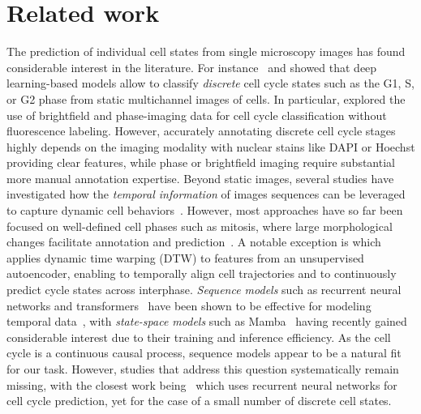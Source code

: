 \section{Related work}
The prediction of individual cell states from single microscopy images has found considerable interest in the literature. For instance~\cite{rappez_deepcycle_2020} and \cite{narotamo_machine_2021, li_predicting_2024} showed that deep learning-based models allow to classify \emph{discrete} cell cycle states such as the G1, S, or G2 phase from static multichannel images of cells. In particular, \cite{eulenberg_reconstructing_2017,blasi_label-free_2016,jin_imbalanced_2021,he_cell_2022} explored the use of brightfield and phase-imaging data for cell cycle classification without fluorescence labeling. However, accurately annotating discrete cell cycle stages highly depends on the imaging modality with nuclear stains like DAPI or Hoechst providing clear features, while phase or brightfield imaging require substantial more manual annotation expertise. 
Beyond static images, several studies have investigated how the \emph{temporal information} of images sequences can be leveraged to capture dynamic cell behaviors~\cite{wang_live-cell_2020, zhao_insights_2024,chu_prediction_2020}. 
However, most approaches have so far been focused on well-defined cell phases such as mitosis, where large morphological changes facilitate annotation and prediction~\cite{held_cellcognition_2010,moreno-andres_livecellminer_2022,jose_automatic_2024, su_spatiotemporal_2017}. A notable exception is \cite{ulicna_learning_2023} which applies dynamic time warping (DTW) to features from an unsupervised autoencoder, enabling to temporally align cell trajectories and to continuously predict cycle states across interphase. 
\emph{Sequence models} such as recurrent neural networks and transformers~\cite{vaswani_attention_nodate} have been shown to be effective for modeling temporal data~\cite{hewamalage2021recurrent,wen2022transformers}, with \emph{state-space models} such as Mamba~\cite{gu_efficiently_2022,gu_mamba_2024} having recently gained considerable interest due to their training and inference efficiency. 
As the cell cycle is a continuous causal process, sequence models appear to be a natural fit for our task. However, studies that address this question systematically remain missing, with the closest work being~\cite{jose_automatic_2024} which uses recurrent neural networks for cell cycle prediction, yet for the case of a small number of discrete cell states.